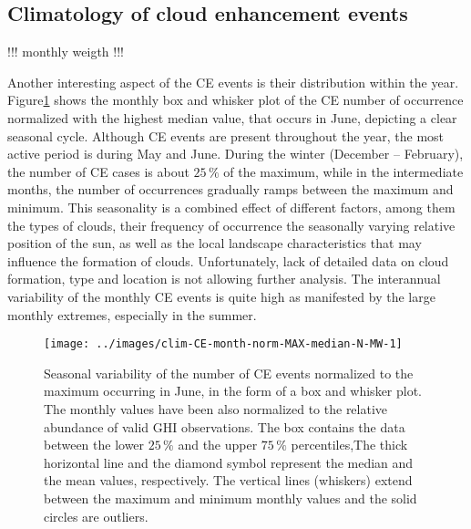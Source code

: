 \documentclass[preprint, 5p,
authoryear]{elsarticle} %
\begin{document}
\hypertarget{climatology-of-cloud-enhancement-events}{%
\subsection{Climatology of cloud enhancement
events}\label{climatology-of-cloud-enhancement-events}}

!!! monthly weigth !!!

Another interesting aspect of the CE events is their distribution within
the year. Figure\nobreakspace{}\ref{fig:relative-month-occurrences}
shows the monthly box and whisker plot of the CE number of occurrence
normalized with the highest median value, that occurs in June, depicting
a clear seasonal cycle. Although CE events are present throughout the
year, the most active period is during May and June. During the winter
(December -- February), the number of CE cases is about \(25\,\%\) of
the maximum, while in the intermediate months, the number of occurrences
gradually ramps between the maximum and minimum. This seasonality is a
combined effect of different factors, among them the types of clouds,
their frequency of occurrence the seasonally varying relative position
of the sun, as well as the local landscape characteristics that may
influence the formation of clouds. Unfortunately, lack of detailed data
on cloud formation, type and location is not allowing further analysis.
The interannual variability of the monthly CE events is quite high as
manifested by the large monthly extremes, especially in the summer.

\begin{figure}

{\centering \texttt{[image: ../images/clim-CE-month-norm-MAX-median-N-MW-1]} 

}

\caption{Seasonal variability of the number of CE events normalized to the maximum occurring in June, in the form of a box and whisker plot. The monthly values have been also normalized to the relative abundance of valid GHI observations. The box contains the data between the lower $25\,\%$ and the upper $75\,\%$ percentiles,The thick horizontal line and the diamond symbol represent the median and the mean values, respectively. The vertical lines (whiskers) extend between the maximum and minimum monthly values and the solid circles are outliers.}\label{fig:relative-month-occurrences}
\end{figure}
\end{document}
